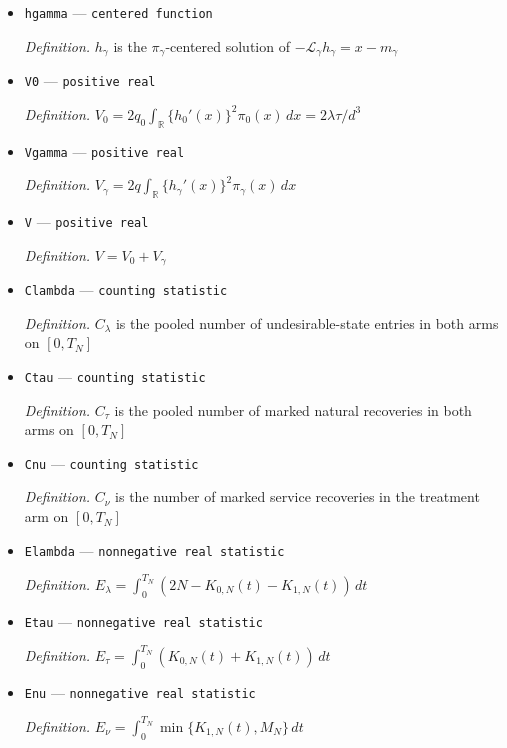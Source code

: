 \documentclass{article}
\begin{document}
\begin{itemize}
  \par\smallskip\noindent\emph{Definition.} \(h_0\) is the \(\pi_0\)-centered solution of \(-\mathcal L_0h_0=x\)
  \item \texttt{hgamma} --- \texttt{centered function}
  \par\smallskip\noindent\emph{Definition.} \(h_\gamma\) is the \(\pi_\gamma\)-centered solution of \(-\mathcal L_\gamma h_\gamma=x-m_\gamma\)
  \item \texttt{V0} --- \texttt{positive real}
  \par\smallskip\noindent\emph{Definition.} \(V_0=2q_0\int_{\mathbb R}\{h_0'(x)\}^2\pi_0(x)\,dx=2\lambda\tau/d^3\)
  \item \texttt{Vgamma} --- \texttt{positive real}
  \par\smallskip\noindent\emph{Definition.} \(V_\gamma=2q\int_{\mathbb R}\{h_\gamma'(x)\}^2\pi_\gamma(x)\,dx\)
  \item \texttt{V} --- \texttt{positive real}
  \par\smallskip\noindent\emph{Definition.} \(V=V_0+V_\gamma\)
  \item \texttt{Clambda} --- \texttt{counting statistic}
  \par\smallskip\noindent\emph{Definition.} \(C_\lambda\) is the pooled number of undesirable-state entries in both arms on \([0,T_N]\)
  \item \texttt{Ctau} --- \texttt{counting statistic}
  \par\smallskip\noindent\emph{Definition.} \(C_\tau\) is the pooled number of marked natural recoveries in both arms on \([0,T_N]\)
  \item \texttt{Cnu} --- \texttt{counting statistic}
  \par\smallskip\noindent\emph{Definition.} \(C_\nu\) is the number of marked service recoveries in the treatment arm on \([0,T_N]\)
  \item \texttt{Elambda} --- \texttt{nonnegative real statistic}
  \par\smallskip\noindent\emph{Definition.} \(E_\lambda=\int_0^{T_N}(2N-K_{0,N}(t)-K_{1,N}(t))\,dt\)
  \item \texttt{Etau} --- \texttt{nonnegative real statistic}
  \par\smallskip\noindent\emph{Definition.} \(E_\tau=\int_0^{T_N}(K_{0,N}(t)+K_{1,N}(t))\,dt\)
  \item \texttt{Enu} --- \texttt{nonnegative real statistic}
  \par\smallskip\noindent\emph{Definition.} \(E_\nu=\int_0^{T_N}\min\{K_{1,N}(t),M_N\}\,dt\)

\end{itemize}
\end{document}
